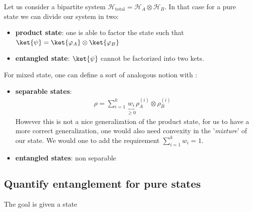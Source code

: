 Let us consider a bipartite system $\mathcal{H}_{\text{total}} = \mathcal{H}_A \otimes \mathcal{H}_B$. In that case for a pure state we can divide our system in two:
\begin{itemize}
    \item \textbf{product state}: one is able to factor the state such that $\ket{\psi} = \ket{\varphi_A} \otimes \ket{\varphi_B}$
    \item \textbf{entangled state}: $\ket{\psi}$ cannot be factorized into two kets.
\end{itemize}
For mixed state, one can define a sort of analogous  notion with :
\begin{itemize}
    \item \textbf{separable states}: 
		\begin{align*} 
			\rho =  \sum_{i= 1}^{k}\underbrace{w_i}_{\geq 0} \rho_A^{\left(i\right)} \otimes \rho_B^{\left(i\right)} 
		\end{align*}
		However this is not a nice generalization of the product state, for us to have a more correct generalization, one would also need convexity in the '\textit{mixture}' of our state. We would one to add the requirement $\sum_{i= 1}^{k}w_i = 1$.
		\item \textbf{entangled states}: non separable
\end{itemize}
 

\subsection{Quantify entanglement for pure states}
The goal is given a state

